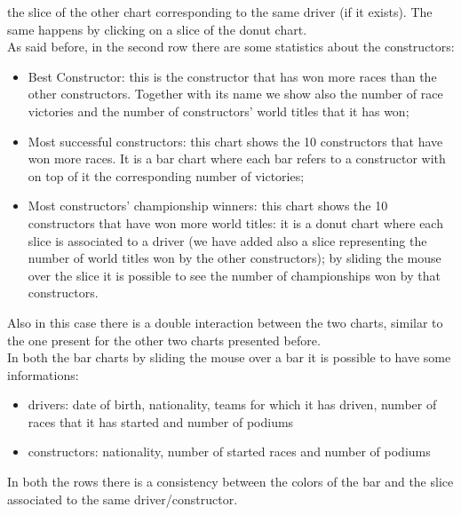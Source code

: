 \documentclass[10pt,twocolumn,letterpaper]{article}
\begin{document}
the slice of the other chart corresponding to the same driver (if it exists). The same happens by clicking on a slice of the donut chart.\\
As said before, in the second row there are some statistics about the constructors:
\begin{itemize}
	\item Best Constructor: this is the constructor that has won more races than the other constructors. Together with its name we show also the number of race victories and
	the number of constructors' world titles that it has won;
	\item Most successful constructors: this chart shows the 10 constructors that have won more races. It is a bar chart where each bar refers to a constructor with on top of
	it the corresponding number of victories;
	\item Most constructors' championship winners: this chart shows the 10 constructors that have won more world titles: it is a donut chart where each slice is associated to
	a driver (we have added also a slice representing the number of world titles won by the other constructors); by sliding the mouse over the slice it is possible to see the
	number of championships won by that constructors.
\end{itemize}
Also in this case there is a double interaction between the two charts, similar to the one present for the other two charts presented before.\\
In both the bar charts by sliding the mouse over a bar it is possible to have some informations:
\begin{itemize}
	\item drivers: date of birth, nationality, teams for which it has driven, number of races that it has started and number of podiums
	\item constructors: nationality, number of started races and number of podiums
\end{itemize}
In both the rows there is a consistency between the colors of the bar and the slice associated to the same driver/constructor.
\end{document}
